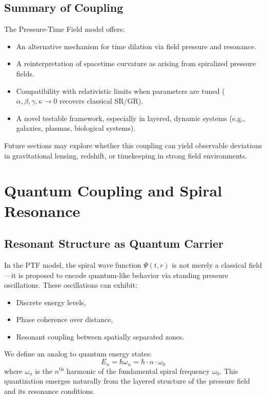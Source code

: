 \documentclass[a4paper,12pt]{article}
\begin{document}
\subsection{Summary of Coupling}

The Pressure-Time Field model offers:
\begin{itemize}
    \item An alternative mechanism for time dilation via field pressure and resonance.
    \item A reinterpretation of spacetime curvature as arising from spiralized pressure fields.
    \item Compatibility with relativistic limits when parameters are tuned (\(\alpha, \beta, \gamma, \kappa \to 0\) recovers classical SR/GR).
    \item A novel testable framework, especially in layered, dynamic systems (e.g., galaxies, plasmas, biological systems).
\end{itemize}

Future sections may explore whether this coupling can yield observable deviations in gravitational lensing, redshift, or timekeeping in strong field environments.

\section{Quantum Coupling and Spiral Resonance}
\label{sec:quantum-spiral}

\subsection{Resonant Structure as Quantum Carrier}

In the PTF model, the spiral wave function \(\Psi(t, r)\) is not merely a classical field—it is proposed to encode quantum-like behavior via standing pressure oscillations. These oscillations can exhibit:
\begin{itemize}
    \item Discrete energy levels,
    \item Phase coherence over distance,
    \item Resonant coupling between spatially separated zones.
\end{itemize}

We define an analog to quantum energy states:
\[
E_n = \hbar \omega_n = \hbar \cdot n \cdot \omega_0
\]
where \(\omega_n\) is the \(n^{\text{th}}\) harmonic of the fundamental spiral frequency \(\omega_0\). This quantization emerges naturally from the layered structure of the pressure field and its resonance conditions.
\end{document}
